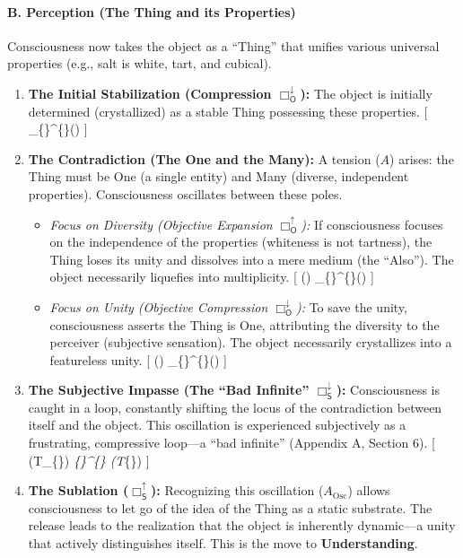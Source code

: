 \paragraph{B. Perception (The Thing and its Properties)}\label{b.-perception-the-thing-and-its-properties}

Consciousness now takes the object as a ``Thing'' that unifies various universal properties (e.g., salt is white, tart, and cubical).

\begin{enumerate}
\def\labelenumi{\arabic{enumi}.}
\tightlist
\item
  \textbf{The Initial Stabilization (Compression \(\Box_{\mathsf{O}}^{\downarrow}\)):} The object is initially determined (crystallized) as a stable Thing possessing these properties. {[} \Box\_\{\}\^{}\{\downarrow\}() {]}
\item
  \textbf{The Contradiction (The One and the Many):} A tension (\(A\)) arises: the Thing must be One (a single entity) and Many (diverse, independent properties). Consciousness oscillates between these poles.

  \begin{itemize}
  \tightlist
  \item
    \emph{Focus on Diversity (Objective Expansion \(\Box_{\mathsf{O}}^{\uparrow}\)):} If consciousness focuses on the independence of the properties (whiteness is not tartness), the Thing loses its unity and dissolves into a mere medium (the ``Also''). The object necessarily liquefies into multiplicity. {[} () \implies \Box\_\{\}\^{}\{\uparrow\}() {]}
  \item
    \emph{Focus on Unity (Objective Compression \(\Box_{\mathsf{O}}^{\downarrow}\)):} To save the unity, consciousness asserts the Thing is One, attributing the diversity to the perceiver (subjective sensation). The object necessarily crystallizes into a featureless unity. {[} () \implies \Box\_\{\}\^{}\{\downarrow\}() {]}
  \end{itemize}
\item
  \textbf{The Subjective Impasse (The ``Bad Infinite'' \(\Box_{\mathsf{S}}^{\downarrow}\)):} Consciousness is caught in a loop, constantly shifting the locus of the contradiction between itself and the object. This oscillation is experienced subjectively as a frustrating, compressive loop---a ``bad infinite'' (Appendix A, Section 6). {[} (T\_\{\}) \leftrightarrow \Box\emph{\{\}\^{}\{\downarrow\} \leftrightarrow {}(T}\{\}) {]}
\item
  \textbf{The Sublation (\(\Box_{\mathsf{S}}^{\uparrow}\)):} Recognizing this oscillation (\(A_{\mathrm{Osc}}\)) allows consciousness to let go of the idea of the Thing as a static substrate. The release leads to the realization that the object is inherently dynamic---a unity that actively distinguishes itself. This is the move to \textbf{Understanding}.
\end{enumerate}

